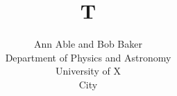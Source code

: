 \documentclass[journal]{IEEEtran}

\title{T}
\author{Ann Able and Bob Baker
\begin{center}
Department of Physics and Astronomy\\ University of X\\ City
\end{center}}
\maketitle
Text.


